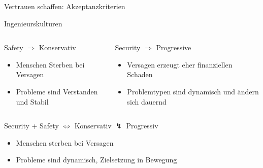 \begin{frame}[T]{Vertrauen schaffen: Akzeptanzkriterien}

\end{frame}
\endgroup

\begin{frame}[T]{Ingenieurskulturen}
	\begin{columns}[t,fullwidth]
		\hfill
		\begin{column}{.45\linewidth}
			\begin{block}{Safety $\Longrightarrow$ Konservativ}
				\begin{itemize}
				\item Menschen Sterben bei Versagen
				\item Probleme sind Verstanden und Stabil
				\end{itemize}
			\end{block}
		\end{column}
		\begin{column}{.45\linewidth}
			\begin{block}{Security $\Longrightarrow$ Progressive}
				\begin{itemize}
				\item Versagen erzeugt eher finanziellen Schaden
				\item Problemtypen sind dynamisch und ändern sich dauernd
				\end{itemize}
			\end{block}
		\end{column}
		\hfill
	\end{columns}

	\begin{columns}[t,fullwidth]
			\hfill
	\begin{column}{\textwidth}
		\hfill\begin{block}{Security + Safety $\Longleftrightarrow$ Konservativ $\lightning$ Progressiv}
	    \begin{itemize}
	      \item Menschen sterben bei Versagen
	      \item Probleme sind dynamisch, Zielsetzung in Bewegung
	    \end{itemize}
  	\end{block}
  			\end{column}
  					\hfill
  	\end{columns}
\end{frame}

